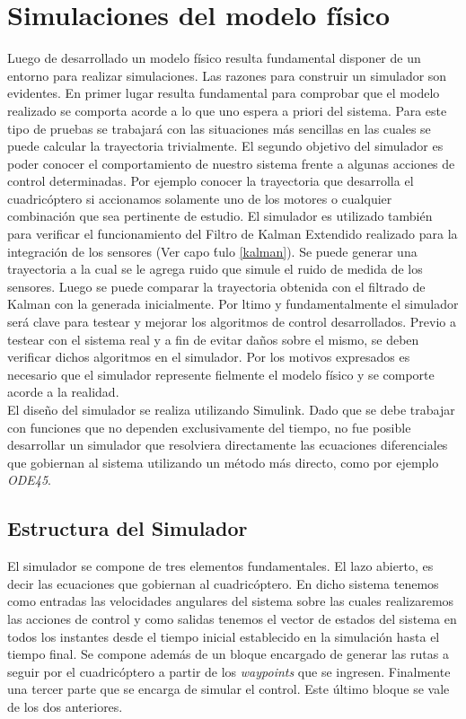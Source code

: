 \documentclass[main]{subfiles}
\begin{document}
\chapter{Simulaciones del modelo f\'isico}
\label{chap:simulador}

Luego de desarrollado un modelo f\'isico resulta fundamental disponer de un entorno para realizar simulaciones. Las razones para construir un simulador son evidentes. En primer lugar resulta fundamental para comprobar que el modelo realizado se comporta acorde a lo que uno espera a priori del sistema. Para este tipo de pruebas se trabajar\'a con las situaciones m\'as sencillas en las cuales se puede calcular la trayectoria trivialmente. El segundo objetivo del simulador es poder conocer el comportamiento de nuestro sistema frente a algunas acciones de control determinadas. Por ejemplo conocer la trayectoria que desarrolla el cuadric\'optero si accionamos solamente uno de los motores o cualquier combinaci\'on que sea pertinente de estudio. El simulador es utilizado tambi\'en para verificar el funcionamiento del Filtro de Kalman Extendido realizado para la integraci\'on de los sensores (Ver capo \'tulo \ref{kalman}). Se puede generar una trayectoria a la cual se le agrega ruido que simule el ruido de medida de los sensores. Luego se puede comparar la trayectoria obtenida con el filtrado de Kalman con la generada inicialmente. Por 	ltimo y fundamentalmente el simulador ser\'a clave para testear y mejorar los algoritmos de control desarrollados. Previo a testear con el sistema real y a fin de evitar da\~nos sobre el mismo, se deben verificar dichos algoritmos en el simulador. Por los motivos expresados es necesario que el simulador represente fielmente el modelo f\'isico y se comporte acorde a la realidad. \\

El dise\~no del simulador se realiza utilizando Simulink. Dado que se debe trabajar con funciones que no dependen exclusivamente del tiempo, no fue posible desarrollar un simulador que resolviera directamente las ecuaciones diferenciales que gobiernan al sistema utilizando un m\'etodo m\'as directo, como por ejemplo \emph{ODE45}. 



\section{Estructura del Simulador}

El simulador se compone de tres elementos fundamentales. El lazo abierto, es decir las ecuaciones que gobiernan al cuadric\'optero. En dicho sistema tenemos como entradas las velocidades angulares del sistema sobre las cuales realizaremos las acciones de control y como salidas tenemos el vector de estados del sistema en todos los instantes desde el tiempo inicial establecido en la simulaci\'on hasta el tiempo final. Se compone adem\'as de un bloque encargado de generar las rutas a seguir por el cuadric\'optero a partir de los \emph{waypoints} que se ingresen. Finalmente una tercer parte que se encarga de simular el control. Este \'ultimo bloque se vale de los dos anteriores.
\end{document}
